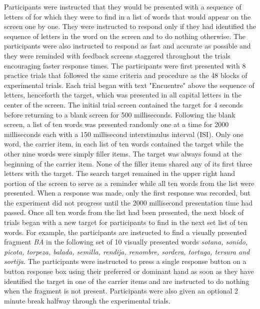 Participants were instructed that they would be presented with a sequence of letters of for which they were to find in a list of words that would appear on the screen one by one. They were instructed to respond only if they had identified the sequence of letters in the word on the screen and to do nothing otherwise. The participants were also instructed to respond as fast and accurate as possible and they were reminded with feedback screens staggered throughout the trials encouraging faster response times. The participants were first presented with 8 practice trials that followed the same criteria and procedure as the 48 blocks of experimental trials. Each trial began with text "Encuentre" above the sequence of letters, henceforth the target, which was presented in all capital letters in the center of the screen. The initial trial screen contained the target for 4 seconds before returning to a blank screen for 500 milliseconds. Following the blank screen, a list of ten words was presented randomly one at a time for 2000 milliseconds each with a 150 millisecond interstimulus interval (ISI). Only one word, the carrier item, in each list of ten words contained the target while the other nine words were simply filler items. The target was always found at the beginning of the carrier item. None of the filler items shared any of its first three letters with the target. The search target remained in the upper right hand portion of the screen to serve as a reminder while all ten words from the list were presented. When a response was made, only the first response was recorded, but the experiment did not progress until the 2000 millisecond presentation time had passed. Once all ten words from the list had been presented, the next block of trials began with a new target for participants to find in the next set list of ten words. For example, the participants are instructed to find a visually presented fragment \emph{BA} in the following set of 10 visually presented words \emph{sotana, sonido, picota, torpeza, balada, semilla, rendija, renombre, sordera, tortuga, tersura and sortija}. The participants were instructed to press a single response button on a button response box using their preferred or dominant hand as soon as they have identified the target in one of the carrier items and are instructed to do nothing when the fragment is not present. Participants were also given an optional 2 minute break halfway through the experimental trials.



